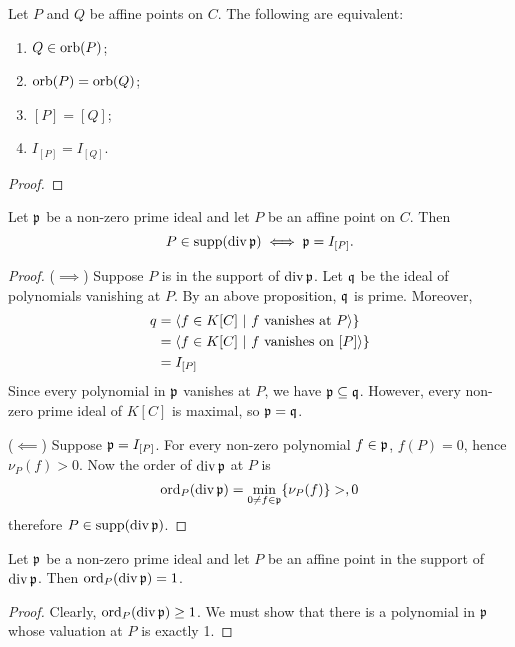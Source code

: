 \begin{proposition}
  Let $P$ and $Q$ be affine points on $C$. The following are equivalent:
  \begin{enumerate}[label=\roman*]
    \item $Q \in \orb(P)$;
    \item $\orb(P) = \orb(Q)$;
    \item $[P] = [Q]$;
    \item $I_{[P]} = I_{[Q]}$.
  \end{enumerate}
\end{proposition}
\begin{proof}
\end{proof}

\begin{proposition}
  Let $\frak p$ be a non-zero prime ideal and let $P$ be an affine point on $C$. Then
  \[ P \in \supp(\div \frak p) \iff \frak p = I_{[P]}. \]
\end{proposition}
\begin{proof}
  ($\implies$)
  Suppose $P$ is in the support of $\div \frak p$.
  Let $\frak q$ be the ideal of polynomials vanishing at $P$.
  By an above proposition, $\frak q$ is prime.
  Moreover,
  \begin{align*}
    q &= \pid{ f \in K[C] ~|~ \text{$f$ vanishes at $P$}} \} \\
      &= \pid{ f \in K[C] ~|~ \text{$f$ vanishes on $[P]$}} \} \\
      &= I_{[P]}
  \end{align*}
  Since every polynomial in $\frak p$ vanishes at $P$, we have $\frak p \subseteq \frak q$.
  However, every non-zero prime ideal of $K[C]$ is maximal, so $\frak p = \frak q$.
  
  ($\impliedby$)
  Suppose $\frak p = I_{[P]}$.
  For every non-zero polynomial $f \in \frak p$, $f(P) = 0$, hence $\nu_P(f) > 0$.
  Now the order of $\div \frak p$ at $P$ is
  \[ \ord_P(\div \frak p) = \min_{0 \neq f \in \frak p}\{ \nu_P(f) \} > ,0 \]
  therefore $P \in \supp(\div \frak p)$.
\end{proof}

\begin{proposition}
  Let $\frak p$ be a non-zero prime ideal and let $P$ be an affine point in the support of $\div \frak p$.
  Then $\ord_P(\div \frak p) = 1$.
\end{proposition}
\begin{proof}
  Clearly, $\ord_P(\div \frak p) \geq 1$.
  We must show that there is a polynomial in $\frak p$ whose valuation at $P$ is exactly 1.
\end{proof}

